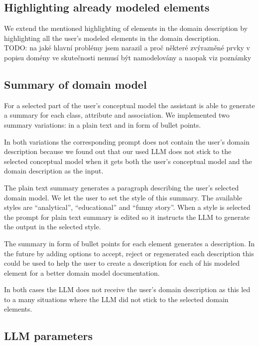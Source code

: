 \subsection{Highlighting already modeled elements}

We extend the mentioned highlighting of elements in the domain description by highlighting all the user's modeled elements in the domain description. \\

TODO: na jaké hlavní problémy jsem narazil a proč některé zvýrazněné prvky v popisu domény ve skutečnosti nemusí být namodelovány a naopak viz poznámky \\


\subsection{Summary of domain model}

For a selected part of the user's conceptual model the assistant is able to generate a summary for each class, attribute and association. We implemented two summary variations: in a plain text and in form of bullet points.

In both variations the corresponding prompt does not contain the user's domain description because we found out that our used LLM does not stick to the selected conceptual model when it gets both the user's conceptual model and the domain description as the input.

The plain text summary generates a paragraph describing the user's selected domain model. We let the user to set the style of this summary. The available styles are ``analytical'', ``educational'' and ``funny story''. When a style is selected the prompt for plain text summary is edited so it instructs the LLM to generate the output in the selected style.

The summary in form of bullet points for each element generates a description. In the future by adding options to accept, reject or regenerated each description this could be used to help the user to create a description for each of his modeled element for a better domain model documentation.

In both cases the LLM does not receive the user's domain description as this led to a many situations where the LLM did not stick to the selected domain elements.


\subsection{LLM parameters}

